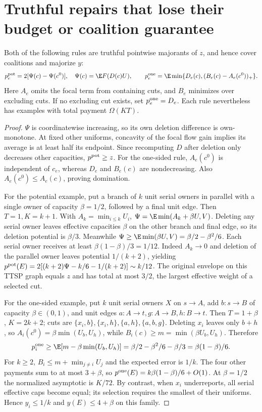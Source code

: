 \section{Truthful repairs that lose their budget or coalition guarantee}
\label{noise:repairs}
\begin{proposition}\label{noise:deletion}
Both of the following rules are truthful pointwise majorants of $z$, and
hence cover coalitions and majorize $y$:
\[
 p_e^{\rm pot}=2[\Psi(c)-\Psi(c^0)],\quad
 \Psi(c)=\E F(D(c)U),
 \qquad
 p_e^{\rm one}=\E\min\{D_e(c),(B_e(c)-A_e(c^0))_+\}.
\]
Here $A_e$ omits the focal term from containing cuts, and $B_e$ minimizes
over excluding cuts. If no excluding cut exists, set $p_e^{\rm one}=D_e$.
Each rule nevertheless has examples with total payment $\Omega(KT)$.
\end{proposition}
\begin{proof}
$\Psi$ is coordinatewise increasing, so its own deletion difference is
own-monotone. At fixed other uniforms, concavity of the focal flow gain
implies its average is at least half its endpoint. Since recomputing $D$
after deletion only decreases other capacities, $p^{\rm pot}\ge z$.
For the one-sided rule, $A_e(c^0)$ is independent of $c_e$, whereas $D_e$
and $B_e(c)$ are nondecreasing. Also $A_e(c^0)\le A_e(c)$, proving domination.

For the potential example, put a branch of $k$ unit serial owners in parallel
with a single owner of capacity $\beta=1/2$, followed by a final unit edge.
Then $T=1,K=k+1$. With $A_k=\min_{i\le k}U_i$,
$\Psi=\E\min(A_k+\beta U,V)$. Deleting any serial owner leaves effective
capacities $\beta$ on the other branch and final edge, so its deletion
potential is $\beta/3$. Meanwhile
$\Psi\ge\E\min(\beta U,V)=\beta/2-\beta^2/6$.
Each serial owner receives at least $\beta(1-\beta)/3=1/12$.
Indeed $A_k\to0$ and deletion of the parallel owner leaves potential
$1/(k+2)$, yielding
$p^{\rm pot}(E)=2[(k+2)\Psi-k/6-1/(k+2)]\sim k/12$.
The original envelope on this TTSP graph equals $z$ and has total at most
$3/2$, the largest effective weight of a selected cut.

For the one-sided example, put $k$ unit serial owners $X$ on $s\to A$,
add $b:s\to B$ of capacity $\beta\in(0,1)$, and unit edges
$a:A\to t,g:A\to B,h:B\to t$. Then $T=1+\beta$, $K=2k+2$; cuts are
$\{x_i,b\},\{x_i,h\},\{a,h\},\{a,b,g\}$.
Deleting $x_i$ leaves only $b+h$, so
$A_i(c^0)=\beta\min(U_b,U_h)$, while
$B_i(c)\ge m=\min(\beta U_b,U_h)$. Therefore
\[
 p_i^{\rm one}\ge\E[m-\beta\min(U_b,U_h)]
 =\beta/2-\beta^2/6-\beta/3=\beta(1-\beta)/6.
\]
For $k\ge2$, $B_i\le m+\min_{j\ne i}U_j$ and the expected error is
$1/k$. The four other payments sum to at most $3+\beta$, so
$p^{\rm one}(E)=k\beta(1-\beta)/6+O(1)$.
At $\beta=1/2$ the normalized asymptotic is $K/72$.
By contrast, when $x_i$ underreports, all serial effective caps become equal;
its selection requires the smallest of their uniforms. Hence $y_i\le1/k$
and $y(E)\le4+\beta$ on this family.
\end{proof}

